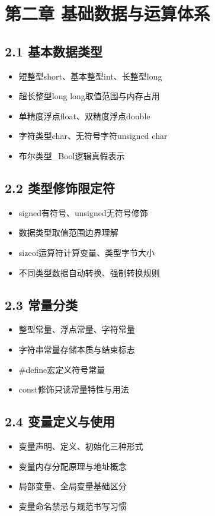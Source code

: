 \section{第二章 基础数据与运算体系}
\subsection{2.1 基本数据类型}
\begin{itemize}
\item 短整型short、基本整型int、长整型long
\item 超长整型long long取值范围与内存占用
\item 单精度浮点float、双精度浮点double
\item 字符类型char、无符号字符unsigned char
\item 布尔类型\_Bool逻辑真假表示
\end{itemize}

\subsection{2.2 类型修饰限定符}
\begin{itemize}
\item signed有符号、unsigned无符号修饰
\item 数据类型取值范围边界理解
\item sizeof运算符计算变量、类型字节大小
\item 不同类型数据自动转换、强制转换规则
\end{itemize}

\subsection{2.3 常量分类}
\begin{itemize}
\item 整型常量、浮点常量、字符常量
\item 字符串常量存储本质与结束标志
\item \#define宏定义符号常量
\item const修饰只读常量特性与用法
\end{itemize}

\subsection{2.4 变量定义与使用}
\begin{itemize}
\item 变量声明、定义、初始化三种形式
\item 变量内存分配原理与地址概念
\item 局部变量、全局变量基础区分
\item 变量命名禁忌与规范书写习惯
\end{itemize}

